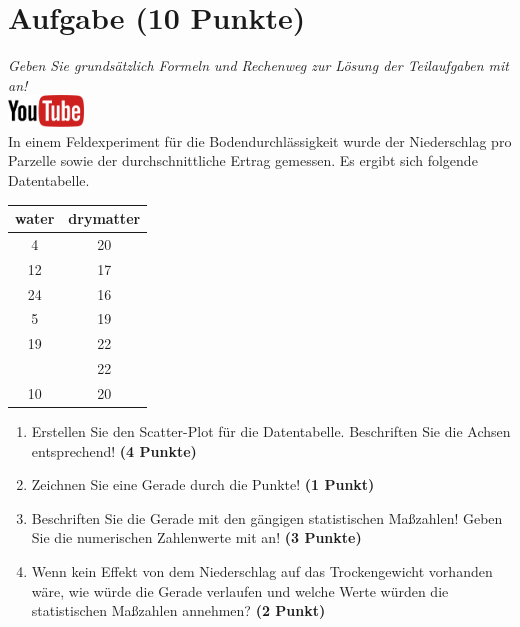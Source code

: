 \documentclass[a4paper, 9pt]{scrartcl}\usepackage[]{graphicx}\usepackage[]{xcolor}
\begin{document}
\section{Aufgabe \hfill (10 Punkte)}

\textit{Geben Sie grunds{\"a}tzlich Formeln und Rechenweg zur L{\"o}sung der
  Teilaufgaben mit an!} \\[1Ex]

\hfill\href{https://youtu.be/VAqiUdV4WQ0}{\includegraphics[width =
  2cm]{img/youtube}}\\[1Ex]

In einem Feldexperiment f{\"u}r die Bodendurchl{\"a}ssigkeit wurde der Niederschlag
pro Parzelle sowie der durchschnittliche Ertrag gemessen. Es ergibt sich
folgende Datentabelle. 

\begin{table}[!h]
\centering
\begin{tabular}{cc}
\toprule
water & drymatter\\
\midrule
4 & 20\\
12 & 17\\
24 & 16\\
5 & 19\\
19 & 22\\
\addlinespace
11 & 22\\
10 & 20\\
\bottomrule
\end{tabular}
\end{table}



\begin{enumerate}
\item Erstellen Sie den Scatter-Plot f{\"u}r die Datentabelle. Beschriften Sie
  die Achsen entsprechend! \textbf{(4 Punkte)}
\item Zeichnen Sie eine Gerade durch die Punkte! \textbf{(1 Punkt)}
\item Beschriften Sie die Gerade mit den g{\"a}ngigen statistischen Ma{\ss}zahlen!
  Geben Sie die numerischen Zahlenwerte mit an! \textbf{(3 Punkte)}
\item Wenn kein Effekt von dem Niederschlag auf das Trockengewicht
  vorhanden w{\"a}re, wie w{\"u}rde die Gerade verlaufen und welche Werte w{\"u}rden die
  statistischen Ma{\ss}zahlen annehmen? \textbf{(2 Punkt)}
\end{enumerate} 
\clearpage
\end{document}
